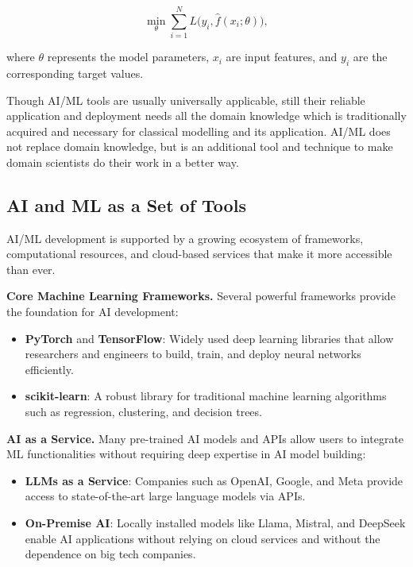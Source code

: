\begin{equation}
    \min_{\theta} \sum_{i=1}^{N} L\big(y_i, \hat{f}(x_i; \theta)\big),
\end{equation}

where \( \theta \) represents the model parameters, \( x_i \) are input features, and \( y_i \) are the corresponding target values.

Though AI/ML tools are usually universally applicable, still their reliable application and deployment needs all the domain knowledge which is traditionally acquired and necessary for classical modelling and its application. AI/ML does not replace domain knowledge, but is an additional tool and technique to make domain scientists do their work in a better way. 

\subsection{AI and ML as a Set of Tools}

AI/ML development is supported by a growing ecosystem of frameworks, computational resources, and cloud-based services that make it more accessible than ever.

\textbf{Core Machine Learning Frameworks.} Several powerful frameworks provide the foundation for AI development:
\begin{itemize}
    \item \textbf{PyTorch} and \textbf{TensorFlow}: Widely used deep learning libraries that allow researchers and engineers to build, train, and deploy neural networks efficiently.
    \item \textbf{scikit-learn}: A robust library for traditional machine learning algorithms such as regression, clustering, and decision trees.
\end{itemize}

\textbf{AI as a Service.} Many pre-trained AI models and APIs allow users to integrate ML functionalities without requiring deep expertise in AI model building:
\begin{itemize}
    \item \textbf{LLMs as a Service}: Companies such as OpenAI, Google, and Meta provide access to state-of-the-art large language models via APIs.
    \item \textbf{On-Premise AI}: Locally installed models like Llama, Mistral, and DeepSeek enable AI applications without relying on cloud services and without the dependence on big tech companies.
\end{itemize}

